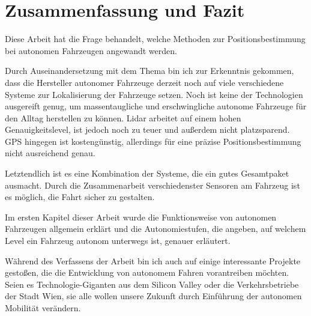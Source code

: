 \chapter{Zusammenfassung und Fazit}

Diese Arbeit hat die Frage behandelt, welche Methoden zur Positionsbestimmung bei autonomen Fahrzeugen angewandt werden.

Durch Auseinandersetzung mit dem Thema bin ich zur Erkenntnis gekommen, dass die Hersteller autonomer Fahrzeuge derzeit noch auf viele verschiedene Systeme zur Lokalisierung der Fahrzeuge setzen. Noch ist keine der Technologien ausgereift genug, um massentaugliche und erschwingliche autonome Fahrzeuge für den Alltag herstellen zu können. \acs{Lidar} arbeitet auf einem hohen Genauigkeitslevel, ist jedoch noch zu teuer und außerdem nicht platzsparend. \ac{GPS} hingegen ist kostengünstig, allerdings für eine präzise Positionsbestimmung nicht ausreichend genau.

Letztendlich ist es eine Kombination der Systeme, die ein gutes Gesamtpaket ausmacht. Durch die Zusammenarbeit verschiedenster Sensoren am Fahrzeug ist es möglich, die Fahrt sicher zu gestalten.

Im ersten Kapitel dieser Arbeit wurde die Funktionsweise von autonomen Fahrzeugen allgemein erklärt und die Autonomiestufen, die angeben, auf welchem Level ein Fahrzeug autonom unterwegs ist, genauer erläutert.

Während des Verfassens der Arbeit bin ich auch auf einige interessante Projekte gestoßen, die die Entwicklung von autonomem Fahren vorantreiben möchten. Seien es Technologie-Giganten aus dem Silicon Valley oder die Verkehrsbetriebe der Stadt Wien, sie alle wollen unsere Zukunft durch Einführung der autonomen Mobilität verändern.
